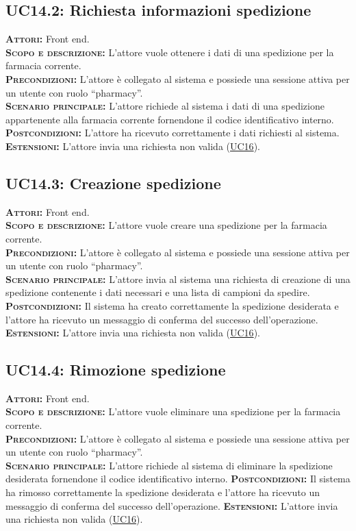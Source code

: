 \subsection{UC14.2: Richiesta informazioni spedizione}
\label{sec:UC142}
\textsc{\textbf{Attori:}} Front end.\\
\textsc{\textbf{Scopo e descrizione:}} L'attore vuole ottenere i dati di una spedizione per la farmacia corrente.\\
\textsc{\textsc{\textbf{Precondizioni:}}} L'attore è collegato al sistema e possiede una sessione attiva per un utente con ruolo ``pharmacy''.\\
\textsc{\textbf{Scenario principale:}} L'attore richiede al sistema i dati di una spedizione appartenente alla farmacia corrente fornendone il codice identificativo interno.
\textsc{\textbf{Postcondizioni:}} L'attore ha ricevuto correttamente i dati richiesti al sistema.\\
\textsc{\textbf{Estensioni:}} L'attore invia una richiesta non valida (\hyperref[sec:UC16]{UC16}).

\subsection{UC14.3: Creazione spedizione}
\label{sec:UC144}
\textsc{\textbf{Attori:}} Front end.\\
\textsc{\textbf{Scopo e descrizione:}} L'attore vuole creare una spedizione per la farmacia corrente.\\
\textsc{\textsc{\textbf{Precondizioni:}}} L'attore è collegato al sistema e possiede una sessione attiva per un utente con ruolo ``pharmacy''.\\
\textsc{\textbf{Scenario principale:}} L'attore invia al sistema una richiesta di creazione di una spedizione contenente i dati necessari e una lista di campioni da spedire.
\textsc{\textbf{Postcondizioni:}} Il sistema ha creato correttamente la spedizione desiderata e l'attore ha ricevuto un messaggio di conferma del successo dell'operazione.
\textsc{\textbf{Estensioni:}} L'attore invia una richiesta non valida (\hyperref[sec:UC16]{UC16}).

\subsection{UC14.4: Rimozione spedizione}
\label{sec:UC144}
\textsc{\textbf{Attori:}} Front end.\\
\textsc{\textbf{Scopo e descrizione:}} L'attore vuole eliminare una spedizione per la farmacia corrente.\\
\textsc{\textsc{\textbf{Precondizioni:}}} L'attore è collegato al sistema e possiede una sessione attiva per un utente con ruolo ``pharmacy''.\\
\textsc{\textbf{Scenario principale:}} L'attore richiede al sistema di eliminare la spedizione desiderata fornendone il codice identificativo interno.
\textsc{\textbf{Postcondizioni:}} Il sistema ha rimosso correttamente la spedizione desiderata e l'attore ha ricevuto un messaggio di conferma del successo dell'operazione.
\textsc{\textbf{Estensioni:}} L'attore invia una richiesta non valida (\hyperref[sec:UC16]{UC16}).

